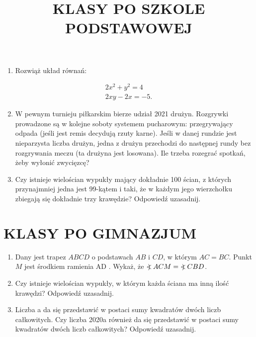 \documentclass[10pt]{article}
\title{KLASY PO SZKOLE PODSTAWOWEJ }
\author{}
\date{}
\newcommand\Varangle{\mathop{{<\!\!\!\!\!\text{\small)}}\:}\nolimits}
\begin{document}
\maketitle
\begin{enumerate}
  \item Rozwiąż układ równań:
\end{enumerate}

\[
\begin{gathered}
2 x^{2}+y^{2}=4 \\
2 x y-2 x=-5 .
\end{gathered}
\]

\begin{enumerate}
  \setcounter{enumi}{1}
  \item W pewnym turnieju piłkarskim bierze udział 2021 drużyn. Rozgrywki prowadzone są w kolejne soboty systemem pucharowym: przegrywający odpada (jeśli jest remis decydują rzuty karne). Jeśli w danej rundzie jest nieparzysta liczba drużyn, jedna z drużyn przechodzi do następnej rundy bez rozgrywania meczu (ta drużyna jest losowana). Ile trzeba rozegrać spotkań, żeby wyłonić zwycięzcę?
  \item Czy istnieje wielościan wypukły mający dokładnie 100 ścian, z których przynajmniej jedna jest 99-kątem i taki, że w każdym jego wierzchołku zbiegają się dokładnie trzy krawędzie? Odpowiedź uzasadnij.
\end{enumerate}

\section*{KLASY PO GIMNAZJUM}
\begin{enumerate}
  \item Dany jest trapez \(A B C D\) o podstawach \(A B\) i \(C D\), w którym \(A C=B C\). Punkt \(M\) jest środkiem ramienia AD . Wykaż, że \(\Varangle A C M=\Varangle C B D\).
  \item Czy istnieje wielościan wypukły, w którym każda ściana ma inną ilość krawędzi? Odpowiedź uzasadnij.
  \item Liczba a da się przedstawić w postaci sumy kwadratów dwóch liczb całkowitych. Czy liczba 2020a również da się przedstawić w postaci sumy kwadratów dwóch liczb całkowitych? Odpowiedź uzasadnij.
\end{enumerate}
\end{document}
